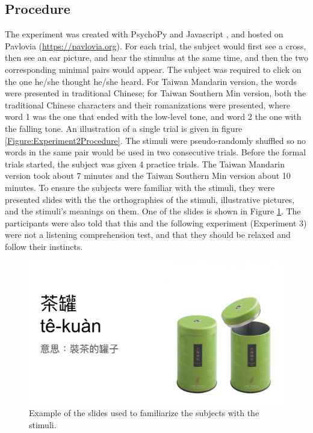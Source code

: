 \subsection{Procedure}
The experiment was created with PsychoPy \citep{Peirce2019} and Javascript \citep{Flanagan2006}, and hosted on Pavlovia (\url{https://pavlovia.org}). For each trial, the subject would first see a cross, then see an ear picture, and hear the stimulus at the same time, and then the two corresponding minimal pairs would appear. The subject was required to click on the one he/she thought he/she heard. For Taiwan Mandarin version, the words were presented in traditional Chinese; for Taiwan Southern Min version, both the traditional Chinese characters and their romanizations were presented, where word 1 was the one that ended with the low-level tone, and word 2 the one with the falling tone. An illustration of a single trial is given in figure  \ref{Figure:Experiment2Procedure}. The stimuli were pseudo-randomly shuffled so no words in the same pair would be used in two consecutive trials. Before the formal trials started, the subject was given 4 practice trials. The Taiwan Mandarin version took about 7 minutes and the Taiwan Southern Min version about 10 minutes. To ensure the subjects were familiar with the stimuli, they were presented slides with the the orthographies of the stimuli, illustrative pictures, and the stimuli's meanings on them. One of the slides is shown in Figure \ref{Figure:Experiment2SlideExample}. The participants were also told that this and the following experiment (Experiment 3) were not a listening comprehension test, and that they should be relaxed and follow their instincts.

\begin{figure}[h]
\centering
\includegraphics[width=.7\textwidth]{figures/E2/SlideExample.jpg}
\caption{Example of the slides used to familiarize the subjects with the stimuli.}
\label{Figure:Experiment2SlideExample}
\end{figure}


